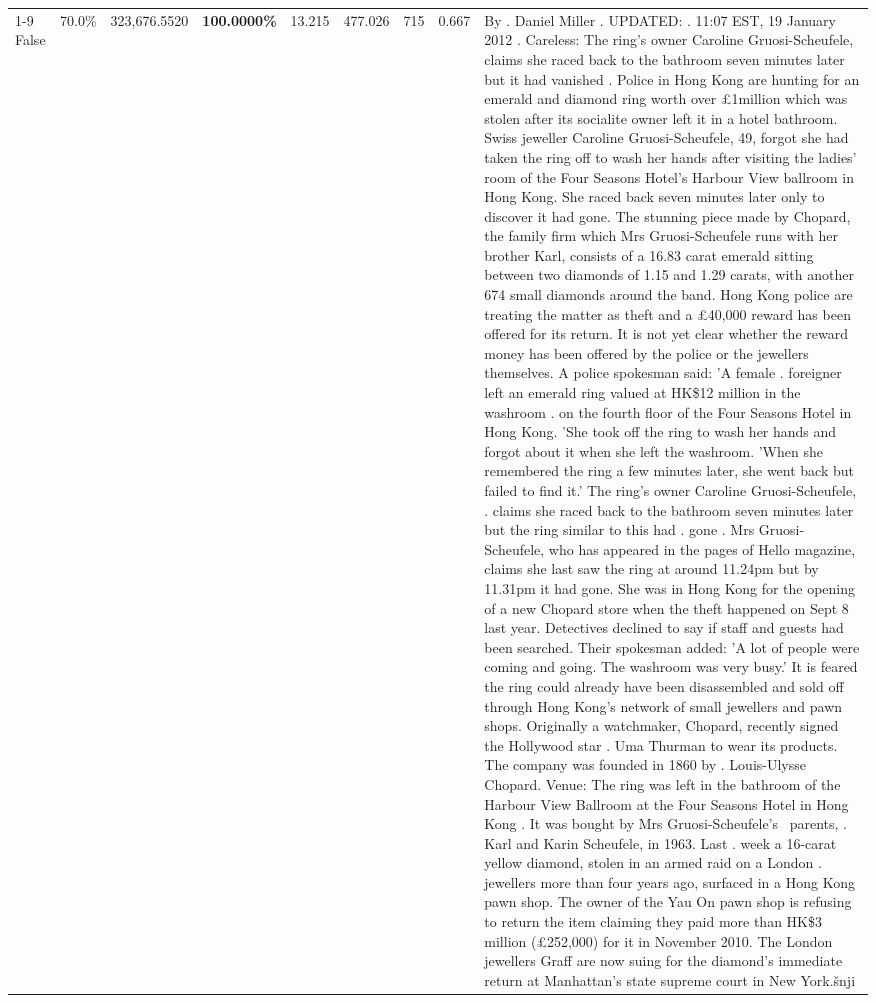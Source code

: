 \begin{table}[H]
\begin{tabular}{lllrlllll}
\cline{1-9}
False & 70.0\% & 323,676.5520 & \bfseries \color{red} 100.0000\% & 13.215 & 477.026 & 715 & 0.667 & By . Daniel Miller . UPDATED: . 11:07 EST, 19 January 2012 . Careless: The ring's owner Caroline Gruosi-Scheufele, claims she raced back to the bathroom seven minutes later but it had vanished . Police in Hong Kong are hunting for an emerald and diamond ring worth over £1million which was stolen after its socialite owner left it in a hotel bathroom. Swiss jeweller Caroline Gruosi-Scheufele, 49, forgot she had taken the ring off to wash her hands after visiting the ladies' room of the Four Seasons Hotel's Harbour View ballroom in Hong Kong. She raced back seven minutes later only to discover it had gone. The stunning piece made by Chopard, the family firm which Mrs Gruosi-Scheufele runs with her brother Karl, consists of a 16.83 carat emerald sitting between two diamonds of 1.15 and 1.29 carats, with another 674 small diamonds around the band. Hong Kong police are treating the matter as theft and a £40,000 reward has been offered for its return. It is not yet clear whether the reward money has been offered by the police or the jewellers themselves. A police spokesman said: 'A female . foreigner left an emerald ring valued at HK\$12 million in the washroom . on the fourth floor of the Four Seasons Hotel in Hong Kong. 'She took off the ring to wash her hands and forgot about it when she left the washroom. 'When she remembered the ring a few minutes later, she went back but failed to find it.' The ring's owner Caroline Gruosi-Scheufele, . claims she raced back to the bathroom seven minutes later but the ring similar to this had . gone . Mrs Gruosi-Scheufele, who has appeared in the pages of Hello magazine, claims she last saw the ring at around 11.24pm but by 11.31pm it had gone. She was in Hong Kong for the opening of a new Chopard store when the theft happened on Sept 8 last year. Detectives declined to say if staff and guests had been searched. Their spokesman added: 'A lot of people were coming and going. The washroom was very busy.' It is feared the ring could already have been disassembled and sold off through Hong Kong's network of small jewellers and pawn shops. Originally a watchmaker, Chopard, recently signed the Hollywood star . Uma Thurman to wear its products. The company was founded in 1860 by . Louis-Ulysse Chopard. Venue: The ring was left in the bathroom of the Harbour View Ballroom at the Four Seasons Hotel in Hong Kong . It was bought by Mrs Gruosi-Scheufele's  parents, . Karl and Karin Scheufele, in 1963. Last . week a 16-carat yellow diamond, stolen in an armed raid on a London . jewellers more than four years ago, surfaced in a Hong Kong pawn shop. The owner of the Yau On pawn shop is refusing to return the item claiming they paid more than HK\$3 million (£252,000) for it in November 2010. The London jewellers Graff are now suing for the diamond’s immediate return at Manhattan’s state supreme court in New York.šnji \\

\end{tabular}
\end{table}

